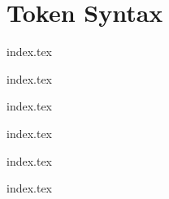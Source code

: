 
\section{Token Syntax}
{
	\lipsum[1]
	
	{index.tex}
	
	{index.tex}
	
	{index.tex}
	
	{index.tex}
	
	{index.tex}
	
	{index.tex}
}

